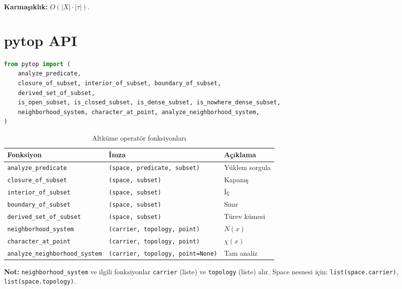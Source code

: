 \noindent\textbf{Karmaşıklık:} $O(|X| \cdot |\tau|)$.

\section{pytop API}

\begin{lstlisting}[language=Python, caption={Subset operatörleri importları}]
from pytop import (
    analyze_predicate,
    closure_of_subset, interior_of_subset, boundary_of_subset,
    derived_set_of_subset,
    is_open_subset, is_closed_subset, is_dense_subset, is_nowhere_dense_subset,
    neighborhood_system, character_at_point, analyze_neighborhood_system,
)
\end{lstlisting}

\begin{table}[h]
\centering
\begin{tabular}{lll}
\toprule
\textbf{Fonksiyon} & \textbf{İmza} & \textbf{Açıklama} \\
\midrule
\texttt{analyze\_predicate} & \texttt{(space, predicate, subset)} & Yüklem sorgula \\
\texttt{closure\_of\_subset} & \texttt{(space, subset)} & Kapanış \\
\texttt{interior\_of\_subset} & \texttt{(space, subset)} & İç \\
\texttt{boundary\_of\_subset} & \texttt{(space, subset)} & Sınır \\
\texttt{derived\_set\_of\_subset} & \texttt{(space, subset)} & Türev kümesi \\
\texttt{neighborhood\_system} & \texttt{(carrier, topology, point)} & $N(x)$ \\
\texttt{character\_at\_point} & \texttt{(carrier, topology, point)} & $\chi(x)$ \\
\texttt{analyze\_neighborhood\_system} & \texttt{(carrier, topology, point=None)} & Tam analiz \\
\bottomrule
\end{tabular}
\caption{Altküme operatör fonksiyonları}
\end{table}

\noindent\textbf{Not:} \texttt{neighborhood\_system} ve ilgili fonksiyonlar \texttt{carrier} (liste)
ve \texttt{topology} (liste) alır. Space nesnesi için: \texttt{list(space.carrier)},
\texttt{list(space.topology)}.

